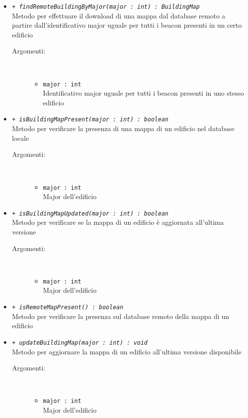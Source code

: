 \documentclass[../DefinizioneDiProdotto.tex]{subfiles}
\begin{document}
\begin{description}
\begin{itemize}
\begin{description}
		\end{description}
		\item \texttt{+ \textit{findRemoteBuildingByMajor(major : int) : BuildingMap}}\\
		Metodo per effettuare il download di una mappa dal database remoto a partire dall'identificativo major uguale per tutti i beacon presenti in un certo edificio
		\begin{description}
			\item[Argomenti:] \
			\begin{itemize}
				\item \texttt{major : int}\\
				Identificativo major uguale per tutti i beacon presenti in uno stesso edificio\end{itemize}
		\end{description}
		\item \texttt{+ \textit{isBuildingMapPresent(major : int) : boolean}}\\
		Metodo per verificare la presenza di una mappa di un edificio nel database locale
		\begin{description}
			\item[Argomenti:] \
			\begin{itemize}
				\item \texttt{major : int}\\
				Major dell'edificio\end{itemize}
		\end{description}
		\item \texttt{+ \textit{isBuildingMapUpdated(major : int) : boolean}}\\
		Metodo per verificare se la mappa di un edificio è aggiornata all'ultima versione
		\begin{description}
			\item[Argomenti:] \
			\begin{itemize}
				\item \texttt{major : int}\\
				Major dell'edificio\end{itemize}
		\end{description}
		\item \texttt{+ \textit{isRemoteMapPresent() : boolean}}\\
		Metodo per verificare la presenza sul database remoto della mappa di un edificio
		\item \texttt{+ \textit{updateBuildingMap(major : int) : void}}\\
		Metodo per aggiornare la mappa di un edificio all'ultima versione disponibile
		\begin{description}
			\item[Argomenti:] \
			\begin{itemize}
				\item \texttt{major : int}\\
				Major dell'edificio\end{itemize}
		\end{description}
	\end{itemize}
\end{description}
\end{document}
